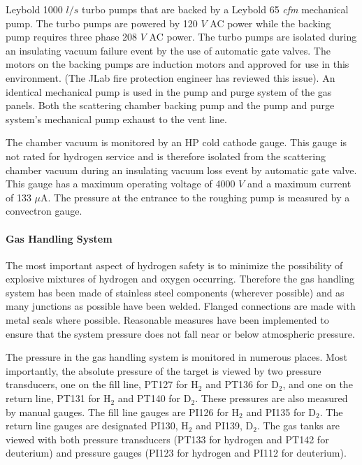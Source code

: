 \begin{safetyen}{0}{0}
{\begin{description}
Leybold 1000 $l/s$ turbo pumps that are backed by a Leybold 65 \emph{cfm}
mechanical pump. The turbo pumps are powered by 120 $V$ AC power
while the backing pump requires three phase 208 $V$ AC power. The
turbo pumps are isolated during an insulating vacuum failure event
by the use of automatic gate valves. The motors on the backing pumps
are induction motors and approved for use in this environment. (The
JLab fire protection engineer has reviewed this issue). An identical
mechanical pump is used in the pump and purge system of the gas panels.
Both the scattering chamber backing pump and the pump and purge system's
mechanical pump exhaust to the vent line.
\item [{\bf Vacuum Gauges}] The chamber vacuum is monitored by an HP cold
cathode gauge. This gauge is not rated for hydrogen service and is
therefore isolated from the scattering chamber vacuum during an insulating
vacuum loss event by automatic gate valve. This gauge has a maximum
operating voltage of 4000 $V$ and a maximum current of 133 $\mu$A.
The pressure at the entrance to the roughing pump is measured by a
convectron gauge. 
\end{description}
}

\paragraph{Gas Handling System}

The most important aspect of hydrogen safety is to minimize the possibility
of explosive mixtures of hydrogen and oxygen occurring. Therefore
the gas handling system has been made of stainless steel components
(wherever possible) and as many junctions as possible have been welded.
Flanged connections are made with metal seals where possible. Reasonable
measures have been implemented to ensure that the system pressure
does not fall near or below atmospheric pressure.

The pressure in the gas handling system is monitored in numerous places.
Most importantly, the absolute pressure of the target is viewed by
two pressure transducers, one on the fill line, PT127 for H$_{2}$
and PT136 for D$_{2}$, and one on the return line, PT131 for H$_{2}$
and PT140 for D$_{2}$. These pressures are also measured by manual
gauges. The fill line gauges are PI126 for H$_{2}$ and PI135 for
D$_{2}$. The return line gauges are designated PI130, H$_{2}$ and
PI139, D$_{2}$. The gas tanks are viewed with both pressure transducers
(PT133 for hydrogen and PT142 for deuterium) and pressure gauges (PI123
for hydrogen and PI112 for deuterium).


\end{safetyen}
